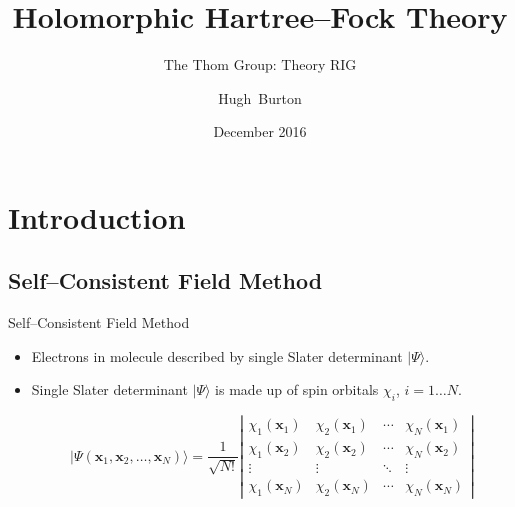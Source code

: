 \documentclass{beamer}
\title[Holomorphic Hartree--Fock Theory]
{%
  Holomorphic Hartree--Fock Theory
}
\subtitle{The Thom Group: Theory RIG}
\author[Burton, Thom]
{
  \hskip-1.7mm
  Hugh~Burton %
}
\institute[Burton and others]
{
  University of Cambridge
}
\date[December 2016]{December 2016}
\newcommand{\ket}[1] {{| #1 \rangle}}
\begin{document}
\begin{frame}
  \titlepage
\end{frame}


\section{Introduction}

\subsection{Self--Consistent Field Method}

\begin{frame}{Self--Consistent Field Method}
 \begin{itemize}
  \item<1-> Electrons in molecule described by single Slater determinant $   \ket{\Psi}$.

  \item<2-> Single Slater determinant $\ket{\Psi}$ is made up of spin orbitals $\chi_i$, $i=1\dots N$.

  $$\ket{\Psi(\mathbf{x}_1, \mathbf{x}_2, \ldots, \mathbf{x}_N)} =
\frac{1}{\sqrt{N!}}
\left|
   \begin{matrix} \chi_1(\mathbf{x}_1) & \chi_2(\mathbf{x}_1) & \cdots & \chi_N(\mathbf{x}_1) \\
                      \chi_1(\mathbf{x}_2) & \chi_2(\mathbf{x}_2) & \cdots & \chi_N(\mathbf{x}_2) \\
                      \vdots & \vdots & \ddots & \vdots \\
                      \chi_1(\mathbf{x}_N) & \chi_2(\mathbf{x}_N) & \cdots & \chi_N(\mathbf{x}_N)
   \end{matrix} \right|$$
 \end{itemize}
\end{frame}
\end{document}
